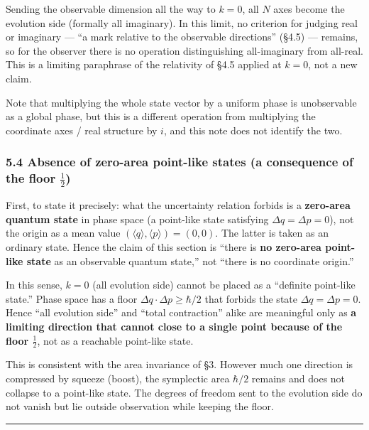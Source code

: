 \documentclass[
]{article}
\begin{document}
Sending the observable dimension all the way to \(k=0\), all \(N\) axes
become the evolution side (formally all imaginary). In this limit, no
criterion for judging real or imaginary --- ``a mark relative to the
observable directions'' (§4.5) --- remains, so for the observer there is
no operation distinguishing all-imaginary from all-real. This is a
limiting paraphrase of the relativity of §4.5 applied at \(k=0\), not a
new claim.

Note that multiplying the whole state vector by a uniform phase is
unobservable as a global phase, but this is a different operation from
multiplying the coordinate axes / real structure by \(i\), and this note
does not identify the two.

\subsubsection{\texorpdfstring{5.4 Absence of zero-area point-like
states (a consequence of the floor
\(\tfrac12\))}{5.4 Absence of zero-area point-like states (a consequence of the floor \textbackslash tfrac12)}}\label{absence-of-zero-area-point-like-states-a-consequence-of-the-floor-tfrac12}

First, to state it precisely: what the uncertainty relation forbids is a
\textbf{zero-area quantum state} in phase space (a point-like state
satisfying \(\Delta q=\Delta p=0\)), not the origin as a mean value
\((\langle q\rangle,\langle p\rangle)=(0,0)\). The latter is taken as an
ordinary state. Hence the claim of this section is ``there is \textbf{no
zero-area point-like state} as an observable quantum state,'' not
``there is no coordinate origin.''

In this sense, \(k=0\) (all evolution side) cannot be placed as a
``definite point-like state.'' Phase space has a floor
\(\Delta q\cdot\Delta p\ge\hbar/2\) that forbids the state
\(\Delta q=\Delta p=0\). Hence ``all evolution side'' and ``total
contraction'' alike are meaningful only as \textbf{a limiting direction
that cannot close to a single point because of the floor \(\tfrac12\)},
not as a reachable point-like state.

This is consistent with the area invariance of §3. However much one
direction is compressed by squeeze (boost), the symplectic area
\(\hbar/2\) remains and does not collapse to a point-like state. The
degrees of freedom sent to the evolution side do not vanish but lie
outside observation while keeping the floor.

\begin{center}\rule{0.5\linewidth}{0.5pt}\end{center}
\end{document}
